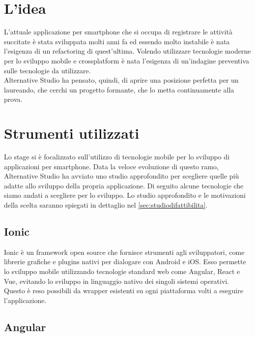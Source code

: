 \section{L'idea}

L'attuale applicazione per smartphone che si occupa di registrare le attività succitate è stata sviluppata molti anni fa ed essendo molto
instabile è nata l'esigenza di un refactoring di quest'ultima. Volendo utilizzare tecnologie moderne per lo sviluppo mobile e crossplatform
è nata l'esigenza di un'indagine preventiva sulle tecnologie da utilizzare. \\
Alternative Studio ha pensato, quindi, di aprire una posizione perfetta per un laureando, che cerchi un progetto formante, che lo metta continuamente alla prova.



\section{Strumenti utilizzati}

Lo stage si è focalizzato sull'utilizzo di tecnologie mobile per lo sviluppo di applicazioni per smartphone. Data la veloce evoluzione di
questo ramo, Alternative Studio ha avviato uno studio approfondito per scegliere quelle più adatte allo sviluppo della
propria applicazione. Di seguito alcune tecnologie che siamo andati a scegliere per lo sviluppo. Lo studio approfondito e le motivazioni
della scelta saranno spiegati in dettaglio nel \autoref{sec:studiodifattibilita}.

\subsection{Ionic}

Ionic è un \gls{framework} open source che fornisce strumenti agli sviluppatori, come librerie grafiche e plugins nativi per dialogare
con \gls{Android} e \gls{iOS}. Esso permette lo sviluppo mobile utilizzando tecnologie standard web come Angular, React e Vue, evitando lo
sviluppo in linguaggio nativo dei singoli sistemi operativi. Questo è reso possibili da wrapper esistenti su ogni piattaforma volti a
eseguire l'applicazione.

\subsection{Angular}

